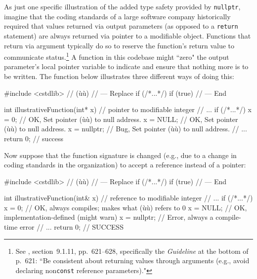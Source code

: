 As just one specific illustration of the added type safety provided by
\lstinline!nullptr!, imagine that the coding standards of a large software company historically required that
values returned via output parameters (as opposed to a \lstinline!return!
statement) are always returned via pointer to a modifiable
object. Functions that return via argument typically do so to reserve the function’s return value to communicate status.{\cprotect\footnote{See \cite{lakos96}, section~9.1.11, pp.~621--628, specifically the \emph{Guideline} at the bottom of p.~621: ``Be consistent about returning values through arguments (e.g., avoid declaring non\lstinline!const! reference parameters)."}} A function in this codebase might ``zero" the output parameter's local pointer variable to indicate and ensure that nothing more is to be written. The function below illustrates three different ways of doing this:

\begin{emcppshiddenlisting}[emcppsbatch=e1]
#include <cstdlib>  // (ù{}ù)
// --- Replace
    if (/*...*/)
    if (true)
// --- End
\end{emcppshiddenlisting}
\begin{emcppslisting}[emcppsbatch=e1]
int illustrativeFunction(int* x)   // pointer to modifiable integer
{
    // ...
    if (/*...*/)
    {
        x = 0;       // OK, Set pointer (ù{}ù) to null address.
        x = NULL;    // OK, Set pointer (ù{}ù) to null address.
        x = nullptr; // Bug, Set pointer (ù{}ù) to null address.
    }
    // ...
    return 0;    // success
}
\end{emcppslisting}


Now suppose that the function signature is changed (e.g., due to a
change in coding standards in the organization) to accept a reference
instead of a pointer:

\begin{emcppshiddenlisting}[emcppsbatch=e2]
#include <cstdlib>  // (ù{}ù)
// --- Replace
    if (/*...*/)
    if (true)
// --- End
\end{emcppshiddenlisting}
\begin{emcppslisting}[emcppsbatch=e2]
int illustrativeFunction(int& x)  // reference to modifiable integer
{
    // ...
    if (/*...*/)
    {
        x = 0;       // OK, always compiles; makes what (ù{}ù) refers to 0
        x = NULL;    // OK, implementation-defined (might warn)
        x = nullptr; // Error, always a compile-time error
    }
    // ...
    return 0;    // SUCCESS
}
\end{emcppslisting}


